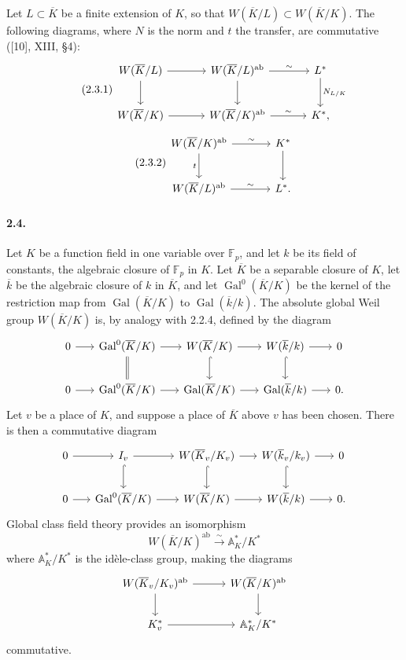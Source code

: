 \documentclass[10pt]{article}
\newcommand{\F}{\mathbb F}
\newcommand{\A}{\mathbb A}
\newcommand{\Gal}{\operatorname{Gal}}
\newcommand{\iso}{\xrightarrow{\sim}}
\providecommand{\ab}{\mathrm{ab}}
\providecommand{\ab}{\mathrm{ab}}
\begin{document}
Let \(L\subset\overline K\) be a finite extension of \(K\), so that \(W(\overline K/L)\subset W(\overline K/K)\). The following diagrams, where \(N\) is the norm and \(t\) the transfer, are commutative ([10], XIII, §4):
\[
\tag{2.3.1}
\begin{tikzcd}[column sep=3.3em,row sep=2.2em]
W(\overline K/L) \arrow[r] \arrow[d] &
W(\overline K/L)^{\ab} \arrow[r,"\sim"] \arrow[d] &
L^* \arrow[d,"N_{L/K}"]\\
W(\overline K/K) \arrow[r] &
W(\overline K/K)^{\ab} \arrow[r,"\sim"] &
K^* ,
\end{tikzcd}
\]
\[
\tag{2.3.2}
\begin{tikzcd}[column sep=3.5em,row sep=2.3em]
W(\overline K/K)^{\ab} \arrow[r,"\sim"] \arrow[d,"t"'] &
K^* \arrow[d]\\
W(\overline K/L)^{\ab} \arrow[r,"\sim"] &
L^* .
\end{tikzcd}
\]

\paragraph{2.4.} Let \(K\) be a function field in one variable over \(\F_p\), and let \(k\) be its field of constants, the algebraic closure of \(\F_p\) in \(K\). Let \(\overline K\) be a separable closure of \(K\), let \(\overline k\) be the algebraic closure of \(k\) in \(\overline K\), and let \(\Gal^0(\overline K/K)\) be the kernel of the restriction map from \(\Gal(\overline K/K)\) to \(\Gal(\overline k/k)\). The absolute global Weil group \(W(\overline K/K)\) is, by analogy with 2.2.4, defined by the diagram
\[
\begin{tikzcd}[column sep=1.7em,row sep=2.1em]
0 \arrow[r] & \Gal^0(\overline K/K) \arrow[r] \arrow[d,equal] &
W(\overline K/K) \arrow[r] \arrow[d,hook] &
W(\overline k/k) \arrow[r] \arrow[d,hook] & 0\\
0 \arrow[r] & \Gal^0(\overline K/K) \arrow[r] &
\Gal(\overline K/K) \arrow[r] &
\Gal(\overline k/k) \arrow[r] & 0 .
\end{tikzcd}
\]
Let \(v\) be a place of \(K\), and suppose a place of \(\overline K\) above \(v\) has been chosen. There is then a commutative diagram
\[
\begin{tikzcd}[column sep=1.6em,row sep=2.1em]
0 \arrow[r] & I_v \arrow[r] \arrow[d,hook] &
W(\overline K_v/K_v) \arrow[r] \arrow[d,hook] &
W(\overline k_v/k_v) \arrow[r] \arrow[d,hook] & 0\\
0 \arrow[r] & \Gal^0(\overline K/K) \arrow[r] &
W(\overline K/K) \arrow[r] &
W(\overline k/k) \arrow[r] & 0 .
\end{tikzcd}
\]
Global class field theory provides an isomorphism
\[
W(\overline K/K)^{\ab}\iso\A_K^*/K^*
\]
where \(\A_K^*/K^*\) is the idèle-class group, making the diagrams
\[
\begin{tikzcd}[column sep=3.0em,row sep=2.0em]
W(\overline K_v/K_v)^{\ab} \arrow[r] \arrow[d] &
W(\overline K/K)^{\ab} \arrow[d]\\
K_v^* \arrow[r] & \A_K^*/K^*
\end{tikzcd}
\]
commutative.
\end{document}
